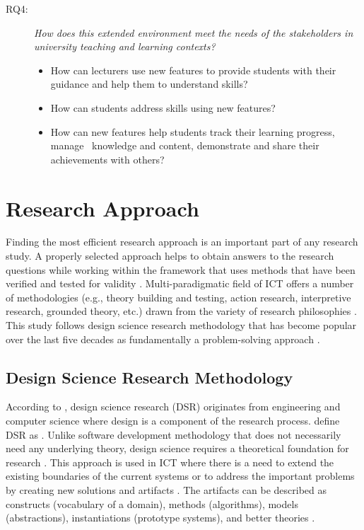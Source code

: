 \begin{description}
	\item[RQ4:] \textit{How does this extended environment meet the needs of the
	stakeholders in university teaching and learning contexts?}
	\begin{itemize}
		\item How can lecturers use new features to provide students with their
		guidance and help them to understand \LLLs skills?
		\item How can students address \LLLs skills using new features?
		\item How can new features help students track their learning progress, manage
		\ep~knowledge and content, demonstrate and share their achievements with
		others?
	\end{itemize}
\end{description}

\section{Research Approach}
\label{sec:method}

Finding the most efficient research approach is an important part of any
research study. A properly selected approach helps to obtain answers to the
research questions while working within the framework that uses methods that
have been verified and tested for validity \citep{Kumar2005}. Multi-paradigmatic
field of ICT offers a number of methodologies (e.g., theory building and
testing, action research, interpretive research, grounded theory, etc.) drawn
from the variety of research philosophies \citep{Vaishnavi2007}. This study
follows design science research methodology that has become popular over the
last five decades as fundamentally a problem-solving approach \citep{Cross1993}.

\subsection{Design Science Research Methodology}

According to \citet{Peffers2008}, design science research (DSR) originates from
engineering and computer science where design is a component of the research
process. \citet[p.~4]{Iivari2009} define DSR as . Unlike software development methodology that
does not necessarily need any underlying theory, design science requires a
theoretical foundation for research \citep{Gero1999}. This approach is used in
ICT where there is a need to extend the existing boundaries of the current
systems or to address the important problems by creating new solutions and
artifacts \citep{Hevner2004}. The artifacts can be described as constructs
(vocabulary of a domain), methods (algorithms), models (abstractions),
instantiations (prototype systems), and better theories \citep{Hevner2010}. 

